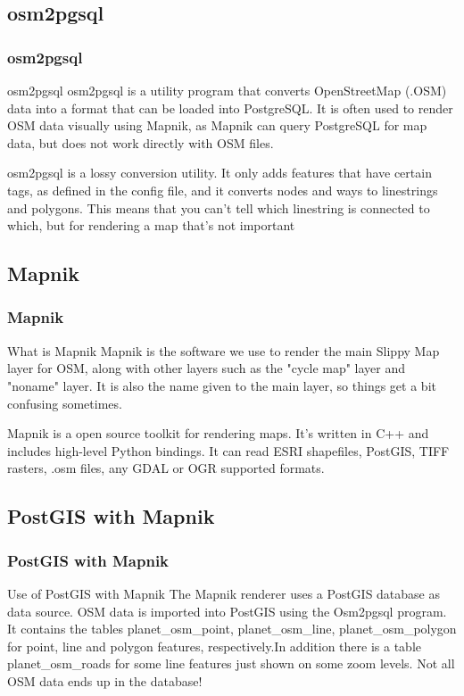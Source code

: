 \documentclass{beamer}
\begin{document}
\subsection{osm2pgsql}
\begin{frame}
\frametitle{osm2pgsql}
\begin{block}{osm2pgsql}
osm2pgsql is a utility program that converts OpenStreetMap (.OSM) data into a format that can be loaded into PostgreSQL. It is often used to render OSM data visually using Mapnik, as Mapnik can query PostgreSQL for map data, but does not work directly with OSM files.
\end{block}
\pause
\begin{block}{}
osm2pgsql is a lossy conversion utility. It only adds features that have certain tags, as defined in the config file, and it converts nodes and ways to linestrings and polygons. This means that you can't tell which linestring is connected to which, but for rendering a map that's not important
\end{block}
\end{frame}

\subsection{Mapnik}
\begin{frame}
\frametitle{Mapnik}
\begin{block}{What is Mapnik}
Mapnik is the software we use to render the main Slippy Map layer for OSM, along with other layers such as the "cycle map" layer and "noname" layer. It is also the name given to the main layer, so things get a bit confusing sometimes.
\end{block}
\pause
\begin{block}{}
Mapnik is a open source toolkit for rendering maps. It's written in C++ and includes high-level Python bindings. It can read ESRI shapefiles, PostGIS, TIFF rasters, .osm files, any GDAL or OGR supported formats.
\end{block}
\end{frame}


\subsection{PostGIS with Mapnik}
\begin{frame}
\frametitle{PostGIS with Mapnik}
\begin{block}{Use of PostGIS with Mapnik}
The Mapnik renderer uses a PostGIS database as data source. OSM data is imported into PostGIS using the Osm2pgsql program.
 It contains the tables planet\_osm\_point, planet\_osm\_line, planet\_osm\_polygon for point, line and polygon features, respectively.In addition there is a table planet\_osm\_roads for some line features just shown on some zoom levels.  Not all OSM data ends up in the database!
\end{block}
\end{frame}
\end{document}
